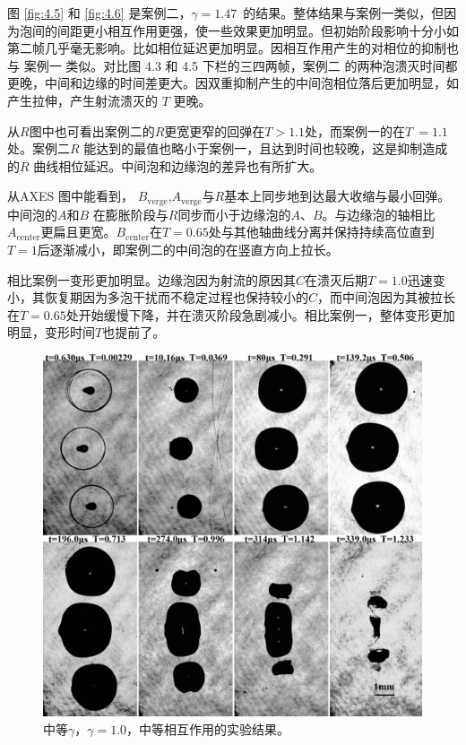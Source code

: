 图 \ref{fig:4.5} 和 \ref{fig:4.6} 是案例二，$\gamma=1.47\,$
的结果。整体结果与案例一类似，但因为泡间的间距更小相互作用更强，使一些效果更加明显。但初始阶段影响十分小如第二帧几乎毫无影响。比如相位延迟更加明显。因相互作用产生的对相位的抑制也与
案例一 类似。对比图 4.3 和 4.5 下栏的三四两帧，案例二
的两种泡溃灭时间都更晚，中间和边缘的时间差更大。因双重抑制产生的中间泡相位落后更加明显，如产生拉伸，产生射流溃灭的
$T$ 更晚。

从$R$图中也可看出案例二的$R$更宽更窄的回弹在$T>1.1$处，而案例一的在$T~=1.1$处。案例二$R$
能达到的最值也略小于案例一，且达到时间也较晚，这是抑制造成的$R$
曲线相位延迟。中间泡和边缘泡的差异也有所扩大。

从AXES 图中能看到，
$B_\text{verge}$,$A_\text{verge}$与$R$基本上同步地到达最大收缩与最小回弹。中间泡的$A$和$B$
在膨胀阶段与$R$同步而小于边缘泡的$A$、$B$。与边缘泡的轴相比$A_\text{center}$更扁且更宽。$B_\text{center}$在$T=0.65$处与其他轴曲线分离并保持持续高位直到$T=1$后逐渐减小，即案例二的中间泡的在竖直方向上拉长。

相比案例一变形更加明显。边缘泡因为射流的原因其$C$在溃灭后期$T= 1.0$迅速变小，其恢复期因为多泡干扰而不稳定过程也保持较小的$C$，而中间泡因为其被拉长在$T=0.65$处开始缓慢下降，并在溃灭阶段急剧减小。相比案例一，整体变形更加明显，变形时间$T$也提前了。

\begin{figure}[H]
    \centering
    \includegraphics[width=0.8\linewidth]{img/fig4.7.png}
    \caption{中等$\gamma$，$\gamma=1.0$，中等相互作用的实验结果。}
    \label{fig:4.7}
\end{figure}



